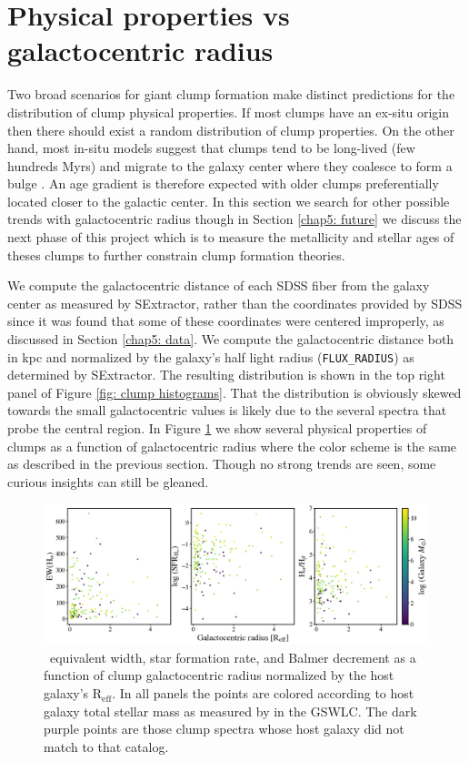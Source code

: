 \section{Physical properties vs galactocentric radius}
\label{chap5: galactocentric radius}

Two broad scenarios for giant clump formation make distinct predictions for the distribution of clump physical properties. If most clumps have an ex-situ origin then there should exist a random distribution of clump properties. On the other hand, most in-situ models suggest that clumps tend to be long-lived (few hundreds Myrs) and migrate to the galaxy center where they coalesce to form a bulge \citep{Bournaud2016}. An age gradient is therefore expected with older clumps preferentially located closer to the galactic center. In this section we search for other possible trends with galactocentric radius though in Section \ref{chap5: future} we discuss the next phase of this project which is to measure the metallicity and stellar ages of theses clumps to further constrain clump formation theories. 


We compute the galactocentric distance of each SDSS fiber from the galaxy center as measured by SExtractor, rather than the coordinates provided by SDSS since it was found  that some of these coordinates were centered improperly, as discussed in Section \ref{chap5: data}. We compute the galactocentric distance both in kpc and normalized by the galaxy's half light radius (\texttt{FLUX\_RADIUS}) as determined by SExtractor. The resulting distribution is shown in the top right panel of Figure \ref{fig: clump histograms}. That the distribution is obviously skewed towards the small galactocentric values is likely due to the several spectra that probe the central region. In Figure \ref{fig: galactocentric radius relations} we show several physical properties of clumps as a function of galactocentric radius where the color scheme is the same as described in the previous section. Though no strong trends are seen, some curious insights can still be gleaned.
  

\begin{figure}
\includegraphics[width=\textwidth]{Figures/clump_galactocentric_Reff.png}
\caption[\ha~EW, SFR, Balmer decrement as a function of clump galactocentric radius.]{\ha~equivalent width, star formation rate, and Balmer decrement as a function of clump galactocentric radius normalized by the host galaxy's R$_{\mathrm{eff}}$. In all panels the points are colored according to host galaxy total stellar mass as measured by \cite{Salim2016} in the GSWLC. The dark purple points are those clump spectra whose host galaxy did not match to that catalog.}
\label{fig: galactocentric radius relations}
\end{figure}



